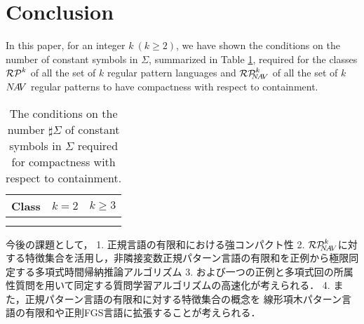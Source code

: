 \section{Conclusion}
In this paper, for an integer $k~(k\ge 2)$, we have shown the conditions on the number of constant symbols in $\Sigma$, summarized in Table \ref{table:results}, required for the classes $\RPatkei$ of all the set of $k$ regular pattern languages and $\NAVRPkei$ of all the set of $k$ $N\!A\!V$ regular patterns to have compactness with respect to containment.
\begin{table}
\caption{The conditions on the number $\sharp \Sigma$ of constant symbols in $\Sigma$ required for compactness with respect to containment.}\label{table:results}
\begin{center}
\begin{tabular}{c|c|c}
  Class & $k=2$ & $k\ge 3$\\
  \hline
  \raisebox{-5pt}{$\RPatkei$} & \raisebox{-5pt}{$\sharp \Sigma \ge 4$} & \raisebox{-5pt}{$\sharp \Sigma \ge 2k-1$} \\[10pt]
  \hline
  \raisebox{-5pt}{$\NAVRPkei$} & \multicolumn{2}{c}{\raisebox{-5pt}{$\sharp \Sigma \ge k+2$}}\\[10pt]
\end{tabular}
\end{center}
\vspace*{-10pt}
\end{table}


{\color{red}今後の課題として，}
{\color{violet} 1. 正規言語の有限和における強コンパクト性}
{\color{blue} 2. $\NAVRPkei$に対する特徴集合を活用し，非隣接変数正規パターン言語の有限和を正例から極限同定する多項式時間帰納推論アルゴリズム}
{\color{magenta} 
3. および一つの正例と多項式回の所属性質問を用いて同定する質問学習アルゴリズムの高速化が考えられる．}
{\color{green} 4. また，正規パターン言語の有限和に対する特徴集合の概念を
線形項木パターン言語\cite{Suzuki2006}の有限和や正則FGS言語\cite{Uchida1994}に拡張することが考えられる．}

